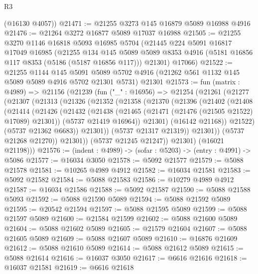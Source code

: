 \begin{lexlean}{R3}
\begin{coremodule}
      (@16130 @4057))
@21471 := @21255 @3273 @145 @16879 @5089 @16988 @4916
@21476 := @21264 @3272 @16877 @5089 @17037 @16988
@21505 := @21255
    @3270
    @1146
    @16818
    @5093
    @16985
    @5704
    (@21445
      @224
      @5091
      @16817
      @17049
      @16985
      (@21255
        @134
        @145
        @5089
        @5089
        @8353
        @4916
        (@5181 @16856 @117 @8353 (@5186 (@5187 @16856 @117)))
        @21301)
      @17066)
@21522 := @21255
    @1144
    @145
    @5091
    @5089
    @5702
    @4916
    (@21262 @561 @1132 @145 @5089 @5089 @4916 @5702 @21301 @5731)
    @21301
@21573 := fun (matrix : @4989) =>
  @21156
    (@21239
      (fun ("_" : @16956) =>
      @21254
        (@21261
          (@21277
            (@21307
              (@21313
                (@21326
                  (@21352
                    (@21358
                      (@21370
                        (@21396
                          (@21402
                            (@21408
                              (@21414
                                (@21426
                                  (@21432
                                    (@21438
                                      (@21465 (@21471 (@21476 (@21505 @21522) @17089) @21301))
                                      (@5737 @21419 @16964))
                                    @21301)
                                  (@16142 @21168))
                                @21522)
                              (@5737 @21362 @6683))
                            @21301))
                        (@5737 @21317 @21319))
                      @21301))
                  (@5737 @21268 @21270))
                @21301))
            (@5737 @21245 @21247))
          @21301)
        (@16021 @21198)))
@21576 := (indent : @4989) -> (sofar : @5203) -> (entry : @4991) -> @5086
@21577 := @16034 @3050
@21578 := @5092 @21577
@21579 := @5088 @21578
@21581 := @10265 @4989 @4912
@21582 := @16034 @21581
@21583 := @5092 @21582
@21584 := @5088 @21583
@21586 := @10279 @4989 @4912
@21587 := @16034 @21586
@21588 := @5092 @21587
@21590 := @5088 @21588 @5093
@21592 := @5088 @21590 @5089
@21594 := @5088 @21592 @5089
@21595 := @20542 @21594
@21597 := @5088 @21595 @5089
@21599 := @5088 @21597 @5089
@21600 := @21584 @21599
@21602 := @5088 @21600 @5089
@21604 := @5088 @21602 @5089
@21605 := @21579 @21604
@21607 := @5088 @21605 @5089
@21609 := @5088 @21607 @5089
@21610 := @16876 @21609
@21612 := @5088 @21610 @5089
@21614 := @5088 @21612 @5089
@21615 := @5088 @21614
@21616 := @16037 @3050
@21617 := @6616 @21616
@21618 := @16037 @21581
@21619 := @6616 @21618

\end{coremodule}
\end{lexlean}
